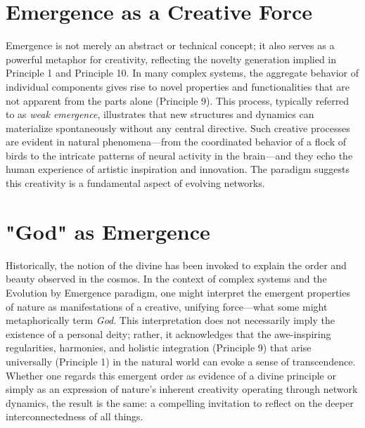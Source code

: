 \documentclass[12pt,openany]{book}
\begin{document}
\section{Emergence as a Creative Force}
Emergence is not merely an abstract or technical concept; it also serves as a powerful metaphor for creativity, reflecting the novelty generation implied in Principle 1 and Principle 10. In many complex systems, the aggregate behavior of individual components gives rise to novel properties and functionalities that are not apparent from the parts alone (Principle 9). This process, typically referred to as \emph{weak emergence}, illustrates that new structures and dynamics can materialize spontaneously without any central directive. Such creative processes are evident in natural phenomena—from the coordinated behavior of a flock of birds to the intricate patterns of neural activity in the brain—and they echo the human experience of artistic inspiration and innovation. The paradigm suggests this creativity is a fundamental aspect of evolving networks. %

\section{"God" as Emergence}
Historically, the notion of the divine has been invoked to explain the order and beauty observed in the cosmos. In the context of complex systems and the Evolution by Emergence paradigm, one might interpret the emergent properties of nature as manifestations of a creative, unifying force—what some might metaphorically term \emph{God}. This interpretation does not necessarily imply the existence of a personal deity; rather, it acknowledges that the awe-inspiring regularities, harmonies, and holistic integration (Principle 9) that arise universally (Principle 1) in the natural world can evoke a sense of transcendence. Whether one regards this emergent order as evidence of a divine principle or simply as an expression of nature's inherent creativity operating through network dynamics, the result is the same: a compelling invitation to reflect on the deeper interconnectedness of all things. %
\end{document}
